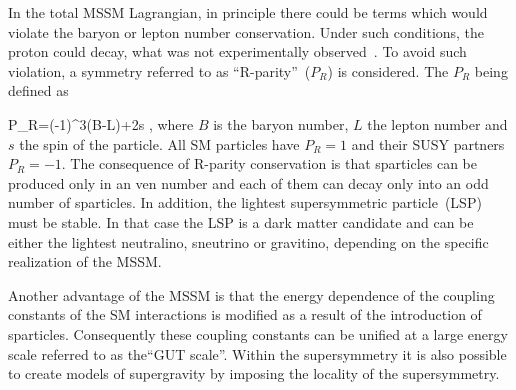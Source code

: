 



In the total MSSM Lagrangian, in principle there could be terms which would violate the baryon or lepton number conservation. Under such conditions, the proton could decay, what was not experimentally observed~\cite{Nishino:2009aa}. To avoid such violation, a symmetry referred to as ``R-parity''~($P_{R}$) is considered. The $P_{R}$ being defined as

{
P_R=(-1)^{3(B-L)+2s },
}
where $B$ is the baryon number, $L$ the lepton number and $s$ the spin of the particle. All SM particles have $P_{R}=1$ and their SUSY partners $P_{R}=-1$. The consequence of R-parity conservation is that sparticles can be produced only in an ven number and each of them can decay only into an odd number of sparticles. In addition, the lightest supersymmetric particle~(LSP) must be stable. In that case the LSP is a dark matter candidate and can be either the lightest neutralino, sneutrino or gravitino, depending on the specific realization of the MSSM. 

Another advantage of the MSSM is that the energy dependence of the coupling constants of the SM interactions is modified as a result of the introduction of sparticles. Consequently these coupling constants can be unified at a large energy scale referred to as  the``GUT scale''. Within the supersymmetry it is also possible to create models of supergravity by imposing the locality of the supersymmetry.



